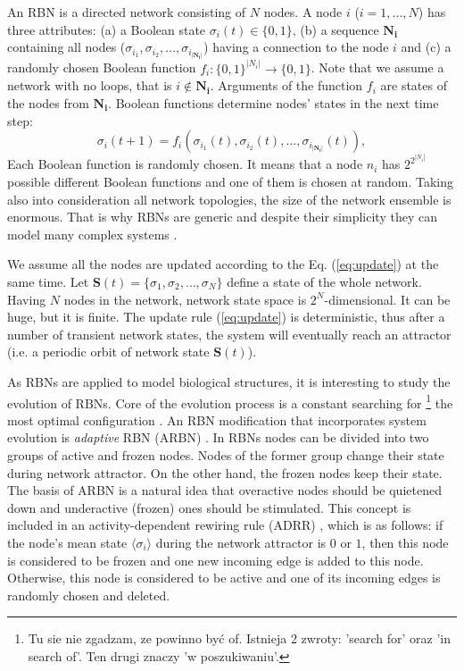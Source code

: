\documentclass[procedia]{easychair}
\begin{document}
	An RBN is a directed network consisting of ${N}$ nodes. A node $i$ ($i=1, ..., N$) has three attributes: (a) a Boolean state $\sigma_i(t)\in \{0,1\}$, (b) a sequence $\boldsymbol{N_i}$ containing all nodes ($\sigma_{i_1}, \sigma_{i_2}, \ldots, \sigma_{i_{|\boldsymbol{N_i}|}}$) having a connection to the node $i$ and (c) a randomly chosen Boolean function $f_i: \{0,1\}^{|N_i|} \rightarrow \{0,1\}$. 
	Note that we assume a network with no loops, that is  $i \not\in \boldsymbol{N_i}$. 
	Arguments of the function $f_i$ are states of the nodes from $\boldsymbol{N_i}$. Boolean functions determine nodes' states in the next time step:
	\begin{equation}
	\sigma_i(t+1) = f_i(\sigma_{i_1}(t), \sigma_{i_2}(t), \ldots, \sigma_{i_{|\boldsymbol{N_i}|}}(t)),
	\label{eq:update}
	\end{equation}
	Each Boolean function is randomly chosen. It means that a node $n_i$ has $2^{2^{|N_i|}}$ possible different Boolean functions and one of them is chosen at random.
	Taking also into consideration all network topologies, the size of the network ensemble is enormous. That is why RBNs are generic and despite their simplicity they can model many complex systems \cite{drossel2008random}. 
	
	We assume all the nodes are updated according to the Eq. (\ref{eq:update}) at the same time. Let $\boldsymbol{S}(t)=\{\sigma_1, \sigma_2, \ldots, \sigma_N\}$ define a state of the whole network. 
	Having $N$ nodes in the network, network state space is $2^N$-dimensional. It can be huge, but it is finite. The update rule (\ref{eq:update}) is deterministic, thus after a number of transient network states, the system will eventually reach an attractor (i.e. a periodic orbit of network state $\boldsymbol{S}(t)$). 
	
	As RBNs are applied to model biological structures, it is interesting to study the evolution of RBNs. Core of the evolution process is a constant searching for \footnote{Tu sie nie zgadzam, ze powinno być of. Istnieja 2 zwroty: 'search for' oraz 'in search of'. Ten drugi znaczy 'w poszukiwaniu'.} the most optimal configuration \cite{aldana2003boolean,sole1996extinction,zimmermann2004coevolution}. 
	An RBN modification that incorporates system evolution is {\it adaptive} RBN (ARBN) \cite{mlb,soc,haruna14relationship,Gorski2016}. 
	In RBNs nodes can be divided into two groups of active and frozen nodes. Nodes of the former group change their state during network attractor. On the other hand, the frozen nodes keep their state. 
	The basis of ARBN is a natural idea that overactive nodes should be quietened down and underactive (frozen) ones should be stimulated. This concept is included in an activity-dependent rewiring rule (ADRR) \cite{bornholdt2000topological}, which is as follows: 
	if the node’s mean state $\langle\sigma_i\rangle$ during the network attractor is $0$ or $1$, then this node
	is considered to be frozen and one new incoming edge is
	added to this node. Otherwise, this node is considered to be active and one of
	its incoming edges is randomly chosen and deleted.
	
\end{document}
